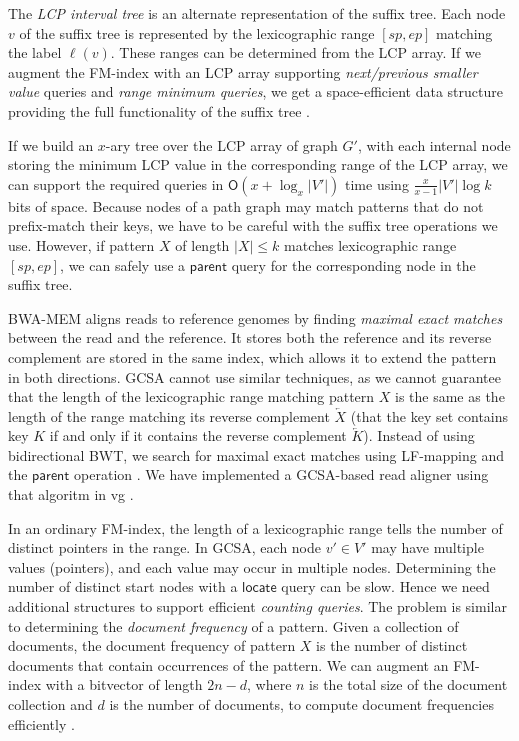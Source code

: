 \documentclass[a4paper,UKenglish]{lipics-v2016}
\newcommand{\abs}[1]{\ensuremath{\lvert #1 \rvert}}
\newcommand{\Oh}[1]{\ensuremath{\mathsf{O}\!\left( #1 \right)}}
\newcommand{\revcomp}[1]{\ensuremath{\overleftarrow{#1}}}
\newcommand{\locate}{\ensuremath{\mathsf{locate}}}
\newcommand{\parent}{\ensuremath{\mathsf{parent}}}
\newcommand{\LFmapping}{LF\nobreakdash-mapping}
\begin{document}
The \emph{LCP interval tree} \cite{Abouelhoda2004} is an alternate representation of the suffix tree. Each node $v$ of the suffix tree is represented by the lexicographic range $[sp, ep]$ matching the label $\ell(v)$. These ranges can be determined from the LCP array. If we augment the FM\nobreakdash-index with an LCP array supporting \emph{next/previous smaller value} queries and \emph{range minimum queries}, we get a space-efficient data structure providing the full functionality of the suffix tree \cite{Fischer2009a}.

If we build an $x$\nobreakdash-ary tree over the LCP array of graph $G'$, with each internal node storing the minimum LCP value in the corresponding range of the LCP array, we can support the required queries in $\Oh{x + \log_{x} \abs{V'}}$ time using $\frac{x}{x-1} \abs{V'} \log k$ bits of space. Because nodes of a path graph may match patterns that do not prefix-match their keys, we have to be careful with the suffix tree operations we use. However, if pattern $X$ of length $\abs{X} \le k$ matches lexicographic range $[sp, ep]$, we can safely use a $\parent$ query for the corresponding node in the suffix tree.

BWA-MEM \cite{Li2013} aligns reads to reference genomes by finding \emph{maximal exact matches} between the read and the reference. It stores both the reference and its reverse complement are stored in the same index, which allows it to extend the pattern in both directions. GCSA cannot use similar techniques, as we cannot guarantee that the length of the lexicographic range matching pattern $X$ is the same as the length of the range matching its reverse complement $\revcomp{X}$ (that the key set contains key $K$ if and only if it contains the reverse complement $\revcomp{K}$). Instead of using bidirectional BWT, we search for maximal exact matches using \LFmapping{} and the $\parent$ operation \cite{Ohlebusch2010a}. We have implemented a GCSA-based read aligner using that algoritm in vg \cite{Garrison2014-2016}.

In an ordinary FM\nobreakdash-index, the length of a lexicographic range tells the number of distinct pointers in the range. In GCSA, each node $v' \in V'$ may have multiple values (pointers), and each value may occur in multiple nodes. Determining the  number of distinct start nodes with a $\locate$ query can be slow. Hence we need additional structures to support efficient \emph{counting queries}. The problem is similar to determining the \emph{document frequency} of a pattern. Given a collection of documents, the document frequency of pattern $X$ is the number of distinct documents that contain occurrences of the pattern. We can augment an FM\nobreakdash-index with a bitvector of length $2n-d$, where $n$ is the total size of the document collection and $d$ is the number of documents, to compute document frequencies efficiently \cite{Sadakane2007a}.
\end{document}
